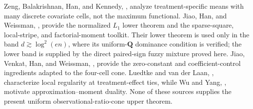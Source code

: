 Zeng, Balakrishnan, Han, and Kennedy, \cite{ZengBalakrishnanHanKennedy2024Discrete}, analyze treatment-specific means with many discrete covariate cells, not the maximum functional.  Jiao, Han, and Weissman, \cite{JiaoHanWeissman2018L1}, provide the normalized \(L_1\) lower theorem and the sparse-square, local-stripe, and factorial-moment toolkit.  Their lower theorem is used only in the band \(d\gtrsim\log^2(en)\), where its uniform-\(\mathbf Q\) dominance condition is verified; the lower band is supplied by the direct paired-sign fuzzy mixture proved here.  Jiao, Venkat, Han, and Weissman, \cite{JiaoVenkatHanWeissman2015Functionals}, provide the zero-constant and coefficient-control ingredients adapted to the four-cell cone.  Luedtke and van der Laan, \cite{LuedtkeVanderLaan2016OptimalValue}, characterize local regularity at treatment-effect ties, while Wu and Yang, \cite{WuYang2016Entropy}, motivate approximation--moment duality.  None of these sources supplies the present uniform observational-ratio-cone upper theorem.